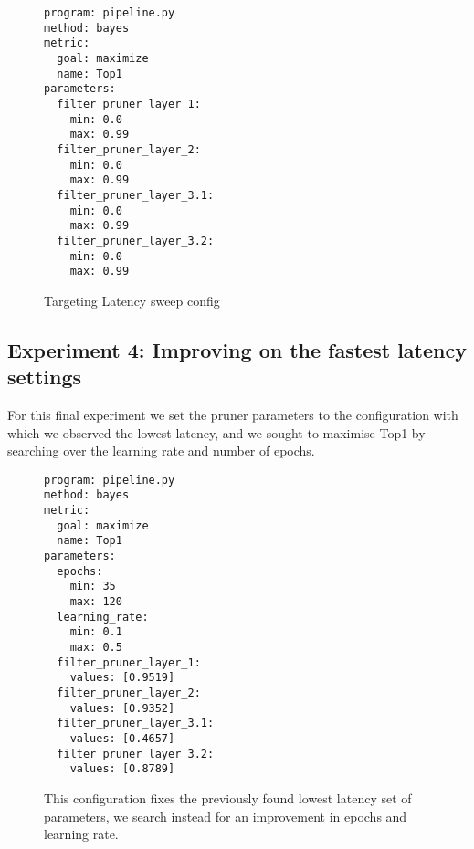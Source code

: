 \documentclass[../Dissertation.tex]{subfiles}
\begin{document}
\singlespacing
\begin{figure}[H]
    \centering
    \begin{verbatim}
program: pipeline.py
method: bayes
metric:
  goal: maximize
  name: Top1
parameters:
  filter_pruner_layer_1:
    min: 0.0
    max: 0.99
  filter_pruner_layer_2:
    min: 0.0
    max: 0.99
  filter_pruner_layer_3.1:
    min: 0.0
    max: 0.99
  filter_pruner_layer_3.2:
    min: 0.0
    max: 0.99
    \end{verbatim}
    \caption{Targeting Latency sweep config}
    \label{fig:Top1SweepConfig}
\end{figure}
\doublespacing

\subsection{Experiment 4: Improving on the fastest latency settings}
For this final experiment we set the pruner parameters to the configuration with which we observed the lowest latency, and we sought to maximise Top1 by searching over the learning rate and number of epochs.
\singlespacing
\begin{figure}[H]
    \centering
    \begin{verbatim}
program: pipeline.py
method: bayes
metric:
  goal: maximize
  name: Top1
parameters:
  epochs:
    min: 35
    max: 120
  learning_rate:
    min: 0.1
    max: 0.5
  filter_pruner_layer_1:
    values: [0.9519]
  filter_pruner_layer_2:
    values: [0.9352]
  filter_pruner_layer_3.1:
    values: [0.4657]
  filter_pruner_layer_3.2:
    values: [0.8789]
    \end{verbatim}
    \caption{This configuration fixes the previously found lowest latency set of parameters, we search instead for an improvement in epochs and learning rate.}
    \label{fig:FinalSweepConfig}
\end{figure}
\doublespacing
\end{document}

